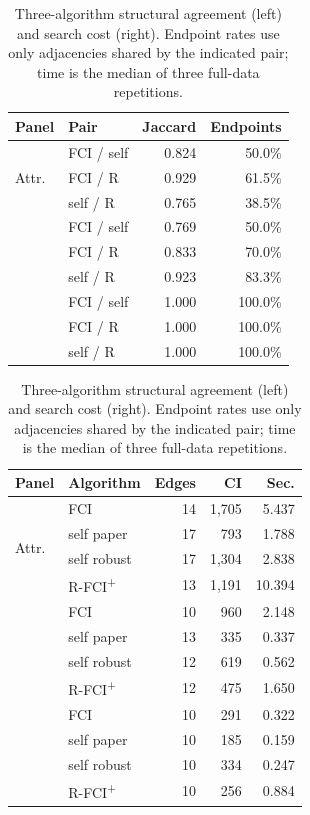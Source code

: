 \documentclass[11pt,a4paper]{article}
\theoremstyle{definition}
\newcommand{\FCIplus}{FCI\textsuperscript{+}}
\begin{document}
\begin{table}[!t]
\caption{Three-algorithm structural agreement (left) and search cost
(right). Endpoint rates use only adjacencies shared by the indicated pair;
time is the median of three full-data repetitions.}
\label{tab:agreement-performance}
\centering
\small
\begin{minipage}[t]{0.46\textwidth}
\centering
\begin{tabular}{llrr}
\toprule
Panel & Pair & Jaccard & Endpoints \\
\midrule
\multirow{3}{*}{Attr.}
 & FCI / self & 0.824 & 50.0\% \\
 & FCI / R & 0.929 & 61.5\% \\
 & self / R & 0.765 & 38.5\% \\
\addlinespace
\multirow{3}{*}{Long.}
 & FCI / self & 0.769 & 50.0\% \\
 & FCI / R & 0.833 & 70.0\% \\
 & self / R & 0.923 & 83.3\% \\
\addlinespace
\multirow{3}{*}{Focus.}
 & FCI / self & 1.000 & 100.0\% \\
 & FCI / R & 1.000 & 100.0\% \\
 & self / R & 1.000 & 100.0\% \\
\bottomrule
\end{tabular}
\end{minipage}
\hfill
\begin{minipage}[t]{0.50\textwidth}
\centering
\begin{tabular}{llrrr}
\toprule
Panel & Algorithm & Edges & CI & Sec. \\
\midrule
\multirow{4}{*}{Attr.}
 & FCI & 14 & 1,705 & 5.437 \\
 & self paper & 17 & 793 & 1.788 \\
 & self robust & 17 & 1,304 & 2.838 \\
 & R-\FCIplus{} & 13 & 1,191 & 10.394 \\
\addlinespace
\multirow{4}{*}{Long.}
 & FCI & 10 & 960 & 2.148 \\
 & self paper & 13 & 335 & 0.337 \\
 & self robust & 12 & 619 & 0.562 \\
 & R-\FCIplus{} & 12 & 475 & 1.650 \\
\addlinespace
\multirow{4}{*}{Focus.}
 & FCI & 10 & 291 & 0.322 \\
 & self paper & 10 & 185 & 0.159 \\
 & self robust & 10 & 334 & 0.247 \\
 & R-\FCIplus{} & 10 & 256 & 0.884 \\
\bottomrule
\end{tabular}
\end{minipage}
\end{table}
\end{document}
